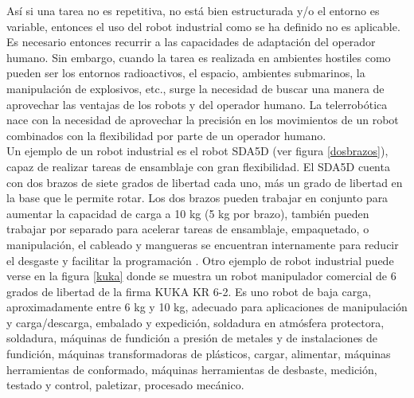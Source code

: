 As\'i si una tarea no es repetitiva, no está bien estructurada y/o el entorno es variable, entonces el uso del robot industrial como se ha definido no es aplicable. Es necesario entonces recurrir a las capacidades de adaptación del operador humano. Sin embargo, cuando la tarea es realizada en ambientes hostiles como pueden ser los entornos  radioactivos, el espacio, ambientes submarinos, la manipulación de explosivos, etc., surge la necesidad de buscar una manera de aprovechar las ventajas de los robots y del operador humano. La telerrobótica nace con la necesidad de aprovechar la precisión en los movimientos de un robot combinados con la flexibilidad por parte de un operador humano.\\
 




Un ejemplo de un robot industrial es el robot SDA5D (ver figura \ref{dosbrazos}), capaz de realizar tareas de ensamblaje con gran flexibilidad. El SDA5D cuenta con dos brazos de siete grados de libertad cada uno, más un grado de libertad en la base que le permite rotar. Los dos brazos pueden trabajar en conjunto para aumentar la capacidad de carga a 10 kg (5 kg por brazo), también pueden trabajar por separado para acelerar tareas de ensamblaje, empaquetado, o manipulación, el cableado y mangueras se encuentran internamente para reducir el desgaste y facilitar la programación . Otro ejemplo de robot industrial puede verse en la figura \ref{kuka} donde se muestra un robot manipulador comercial  de 6 grados de libertad de la firma KUKA KR 6-2. Es uno robot de baja carga, aproximadamente entre 6 kg y 10 kg, adecuado para aplicaciones de manipulación y carga/descarga, 	embalado y expedición, soldadura en atmósfera protectora, 	soldadura, máquinas de fundición a presión de metales y de instalaciones de fundición, máquinas transformadoras de plásticos, cargar, alimentar, máquinas herramientas de conformado, máquinas herramientas de desbaste, medición, testado y control, paletizar, procesado mecánico.


